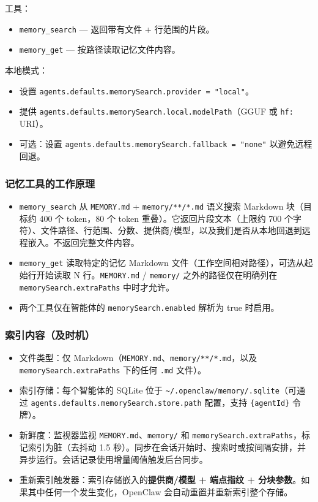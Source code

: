 工具：

\begin{itemize}
  \item \texttt{memory\_search} — 返回带有文件 + 行范围的片段。
  \item \texttt{memory\_get} — 按路径读取记忆文件内容。
\end{itemize}


本地模式：

\begin{itemize}
  \item 设置 \texttt{agents.defaults.memorySearch.provider = "local"}。
  \item 提供 \texttt{agents.defaults.memorySearch.local.modelPath}（GGUF 或 \texttt{hf:} URI）。
  \item 可选：设置 \texttt{agents.defaults.memorySearch.fallback = "none"} 以避免远程回退。
\end{itemize}


\subsubsection{记忆工具的工作原理}


\begin{itemize}
  \item \texttt{memory\_search} 从 \texttt{MEMORY.md} + \texttt{memory/**/*.md} 语义搜索 Markdown 块（目标约 400 个 token，80 个 token 重叠）。它返回片段文本（上限约 700 个字符）、文件路径、行范围、分数、提供商/模型，以及我们是否从本地回退到远程嵌入。不返回完整文件内容。
  \item \texttt{memory\_get} 读取特定的记忆 Markdown 文件（工作空间相对路径），可选从起始行开始读取 N 行。\texttt{MEMORY.md} / \texttt{memory/} 之外的路径仅在明确列在 \texttt{memorySearch.extraPaths} 中时才允许。
  \item 两个工具仅在智能体的 \texttt{memorySearch.enabled} 解析为 true 时启用。
\end{itemize}


\subsubsection{索引内容（及时机）}


\begin{itemize}
  \item 文件类型：仅 Markdown（\texttt{MEMORY.md}、\texttt{memory/**/*.md}，以及 \texttt{memorySearch.extraPaths} 下的任何 \texttt{.md} 文件）。
  \item 索引存储：每个智能体的 SQLite 位于 \texttt{\textasciitilde{}/.openclaw/memory/.sqlite}（可通过 \texttt{agents.defaults.memorySearch.store.path} 配置，支持 \texttt{\{agentId\}} 令牌）。
  \item 新鲜度：监视器监视 \texttt{MEMORY.md}、\texttt{memory/} 和 \texttt{memorySearch.extraPaths}，标记索引为脏（去抖动 1.5 秒）。同步在会话开始时、搜索时或按间隔安排，并异步运行。会话记录使用增量阈值触发后台同步。
  \item 重新索引触发器：索引存储嵌入的\textbf{提供商/模型 + 端点指纹 + 分块参数}。如果其中任何一个发生变化，OpenClaw 会自动重置并重新索引整个存储。
\end{itemize}



